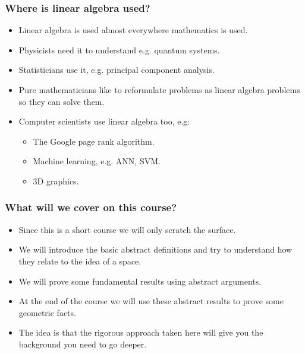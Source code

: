 \documentclass[handout]{beamer}
\begin{document}
\begin{frame}
\frametitle{Where is linear algebra used?}
\begin{itemize}
\item Linear algebra is used almost everywhere mathematics is used.
\vspace{0.3cm}
\item Physicists need it to understand e.g. quantum systems.
\vspace{0.3cm}
\item Statisticians use it, e.g. principal component analysis.
\vspace{0.3cm}
\item Pure mathematicians like to reformulate problems as linear algebra problems so they can solve them.
\vspace{0.3cm}
\item Computer scientists use linear algebra too, e.g:
\begin{itemize}
\vspace{0.3cm}
\item The Google page rank algorithm.
\vspace{0.3cm}
\item Machine learning, e.g. ANN, SVM.
\vspace{0.3cm}
\item 3D graphics.
\end{itemize}
\end{itemize}
\end{frame}

\begin{frame}
\frametitle{What will we cover on this course?}
\begin{itemize}
\item Since this is a short course we will only scratch the surface.
\vspace{0.3cm}
\item We will introduce the basic abstract definitions and try to understand how they relate to the idea of a space.
\vspace{0.3cm}
\item We will prove some fundamental results using abstract arguments.
\vspace{0.3cm}
\item At the end of the course we will use these abstract results to prove some geometric facts.
\vspace{0.3cm}
\item The idea is that the rigorous approach taken here will give you the background you need to go deeper. 
\end{itemize}
\end{frame}
\end{document}

